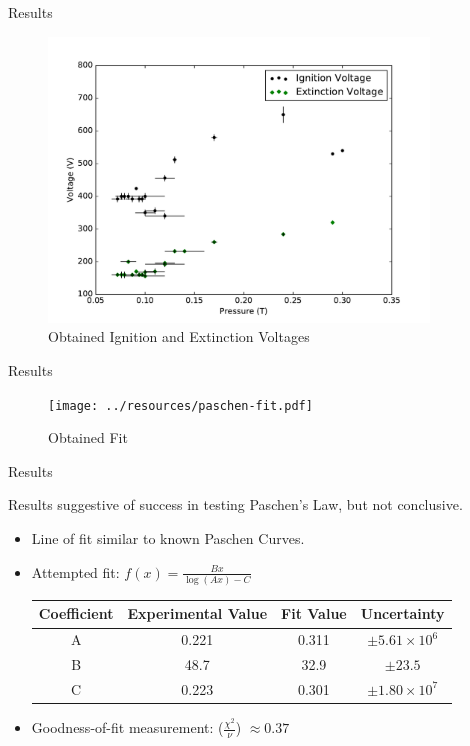 \documentclass{beamer}
\begin{document}
  \begin{frame}{Results}
    \begin{figure}
    \includegraphics[width=0.9\textwidth]{../resources/ignition-extinction.pdf}
    \caption{Obtained Ignition and Extinction Voltages}
    \end{figure}
  \end{frame}
  
  \begin{frame}{Results}
    \begin{figure}
    \texttt{[image: ../resources/paschen-fit.pdf]}
    \caption{Obtained Fit}
    \end{figure}
  \end{frame}
  
  \begin{frame}{Results}
  
    Results suggestive of success in testing Paschen's Law, but not conclusive.
    
    \begin{itemize}
    \item Line of fit similar to known Paschen Curves.
    \item Attempted fit: $f(x) = \frac{Bx}{\log{\left( Ax \right)} - C}$
    
   \begin{center}
    \begin{tabular}{||c c c c||} 
      \hline
      Coefficient & Experimental Value & Fit Value & Uncertainty \\ [0.5ex] 
      \hline\hline
      A & 0.221& 0.311 & $\pm 5.61\times 10^{6}$ \\ 
      \hline
      B & 48.7& 32.9 & $\pm 23.5$ \\
      \hline
      C & 0.223& 0.301 & $\pm 1.80\times 10^{7}$ \\
      \hline
    \end{tabular}
    \end{center}
    
    \item Goodness-of-fit measurement:  ($\frac{\chi^2}{\nu}$) $\approx 0.37$
   
    
    \end{itemize}

  \end{frame}
  
\end{document}
